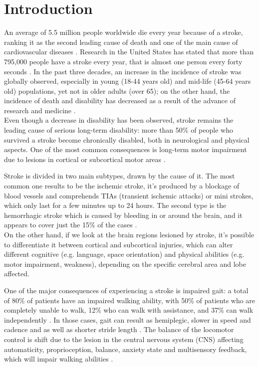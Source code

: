 \chapter{Introduction}
An average of 5.5 million people worldwide die every year because of a stroke, ranking it as the second leading cause of death and one of the main cause of cardiovascular diseases \parencite{Donkor_2018}. Research in the United States has stated that more than 795,000 people have a stroke every year, that is almost one person every forty seconds \parencite{Tsao_2023}. In the past three decades, an increase in the incidence of stroke was globally observed, especially in young (18-44 years old) and mid-life (45-64 years old) populations, yet not in older adults (over 65); on the other hand, the incidence of death and disability has decreased as a result of the advance of research and medicine \parencite{Yahya_2020}. \\
Even though a decrease in disability has been observed, stroke remains the leading cause of serious long-term disability: more than 50\% of people who survived a stroke become chronically disabled, both in neurological and physical aspects. One of the most common consequences is long-term motor impairment due to lesions in cortical or subcortical motor areas \parencite{Karthikeyan_2019}. 

Stroke is divided in two main subtypes, drawn by the cause of it. The most common one results to be the ischemic stroke, it's produced by a blockage of blood vessels and comprehends TIAs (transient ischemic attacks) or mini strokes, which only last for a few minutes up to 24 hours. The second type is the hemorrhagic stroke which is caused by bleeding in or around the brain, and it appears to cover just the 15\% of the cases \parencite{Abdu_2021}. \\
On the other hand, if we look at the brain regions lesioned by stroke, it's possible to differentiate it between cortical and subcortical injuries, which can alter different cognitive (e.g. language, space orientation) and physical abilities (e.g. motor impairment, weakness), depending on the specific cerebral area and lobe affected. 

One of the major consequences of experiencing a stroke is impaired gait: a total of 80\% of patients have an impaired walking ability, with 50\% of patients who are completely unable to walk, 12\% who can walk with assistance, and 37\% can walk independently \parencite{Balaban_2014}. In those cases, gait can result as hemiplegic, slower in speed and cadence and as well as shorter stride length \parencite{Gomez_2020}. The balance of the locomotor control is shift due to the lesion in the central nervous system (CNS) affecting automaticity, proprioception, balance, anxiety state and multisensory feedback, which will impair walking abilities \parencite{Clark_2015}. 

